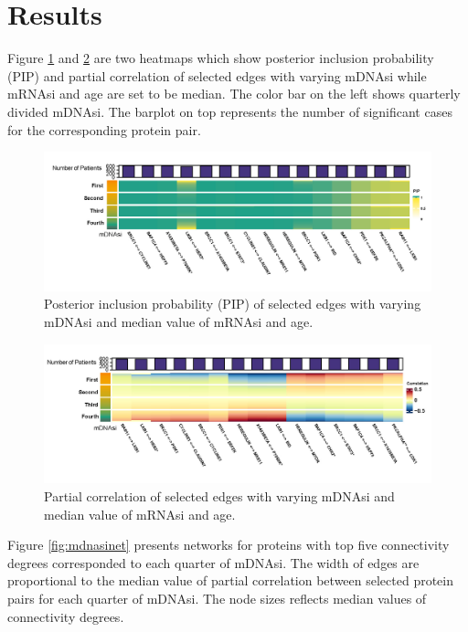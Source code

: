 \documentclass[
]{book}
\begin{document}
\hypertarget{StemnessBCresult}{%
\section{Results}\label{StemnessBCresult}}

Figure \ref{fig:mdnasipip} and \ref{fig:mdnasicor} are two heatmaps which show posterior inclusion probability (PIP) and partial correlation of selected edges with varying mDNAsi while mRNAsi and age are set to be median. The color bar on the left shows quarterly divided mDNAsi. The barplot on top represents the number of significant cases for the corresponding protein pair.

\begin{figure}

{\centering \includegraphics[width=0.9\linewidth]{images/mdna_pip} 

}

\caption{Posterior inclusion probability (PIP) of selected edges with varying mDNAsi and median value of mRNAsi and age.}\label{fig:mdnasipip}
\end{figure}

\begin{figure}

{\centering \includegraphics[width=0.9\linewidth]{images/mdna_cor} 

}

\caption{Partial correlation of selected edges with varying mDNAsi and median value of mRNAsi and age.}\label{fig:mdnasicor}
\end{figure}

Figure \ref{fig:mdnasinet} presents networks for proteins with top five connectivity degrees corresponded to each quarter of mDNAsi. The width of edges are proportional to the median value of partial correlation between selected protein pairs for each quarter of mDNAsi. The node sizes reflects median values of connectivity degrees.
\end{document}
